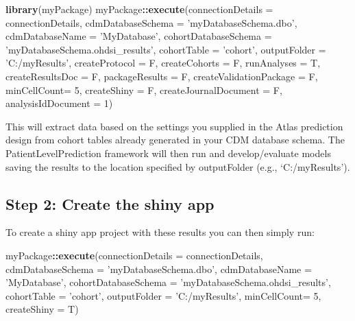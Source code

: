 \documentclass[
]{article}
\newenvironment{Shaded}{\begin{snugshade}}{\end{snugshade}}
\newcommand{\DataTypeTok}[1]{\textcolor[rgb]{0.13,0.29,0.53}{#1}}
\newcommand{\DecValTok}[1]{\textcolor[rgb]{0.00,0.00,0.81}{#1}}
\newcommand{\KeywordTok}[1]{\textcolor[rgb]{0.13,0.29,0.53}{\textbf{#1}}}
\newcommand{\NormalTok}[1]{#1}
\newcommand{\OperatorTok}[1]{\textcolor[rgb]{0.81,0.36,0.00}{\textbf{#1}}}
\newcommand{\StringTok}[1]{\textcolor[rgb]{0.31,0.60,0.02}{#1}}
\begin{document}
\begin{Shaded}
\begin{Highlighting}[]
\KeywordTok{library}\NormalTok{(myPackage)}
\NormalTok{myPackage}\OperatorTok{::}\KeywordTok{execute}\NormalTok{(}\DataTypeTok{connectionDetails =}\NormalTok{ connectionDetails,}
        \DataTypeTok{cdmDatabaseSchema =} \StringTok{'myDatabaseSchema.dbo'}\NormalTok{,}
        \DataTypeTok{cdmDatabaseName =} \StringTok{'MyDatabase'}\NormalTok{,}
        \DataTypeTok{cohortDatabaseSchema =} \StringTok{'myDatabaseSchema.ohdsi_results'}\NormalTok{,}
        \DataTypeTok{cohortTable =} \StringTok{'cohort'}\NormalTok{,}
        \DataTypeTok{outputFolder =} \StringTok{'C:/myResults'}\NormalTok{,}
        \DataTypeTok{createProtocol =}\NormalTok{ F,}
        \DataTypeTok{createCohorts =}\NormalTok{ F,}
        \DataTypeTok{runAnalyses =}\NormalTok{ T,}
        \DataTypeTok{createResultsDoc =}\NormalTok{ F,}
        \DataTypeTok{packageResults =}\NormalTok{ F,}
        \DataTypeTok{createValidationPackage =}\NormalTok{ F, }
        \DataTypeTok{minCellCount=} \DecValTok{5}\NormalTok{,}
        \DataTypeTok{createShiny =}\NormalTok{ F,}
        \DataTypeTok{createJournalDocument =}\NormalTok{ F,}
        \DataTypeTok{analysisIdDocument =} \DecValTok{1}\NormalTok{)}
\end{Highlighting}
\end{Shaded}

This will extract data based on the settings you supplied in the Atlas
prediction design from cohort tables already generated in your CDM
database schema. The PatientLevelPrediction framework will then run and
develop/evaluate models saving the results to the location specified by
outputFolder (e.g., `C:/myResults').

\hypertarget{step-2-create-the-shiny-app}{%
\subsection{Step 2: Create the shiny
app}\label{step-2-create-the-shiny-app}}

To create a shiny app project with these results you can then simply
run:

\begin{Shaded}
\begin{Highlighting}[]
\NormalTok{myPackage}\OperatorTok{::}\KeywordTok{execute}\NormalTok{(}\DataTypeTok{connectionDetails =}\NormalTok{ connectionDetails,}
        \DataTypeTok{cdmDatabaseSchema =} \StringTok{'myDatabaseSchema.dbo'}\NormalTok{,}
        \DataTypeTok{cdmDatabaseName =} \StringTok{'MyDatabase'}\NormalTok{,}
        \DataTypeTok{cohortDatabaseSchema =} \StringTok{'myDatabaseSchema.ohdsi_results'}\NormalTok{,}
        \DataTypeTok{cohortTable =} \StringTok{'cohort'}\NormalTok{,}
        \DataTypeTok{outputFolder =} \StringTok{'C:/myResults'}\NormalTok{,}
        \DataTypeTok{minCellCount=} \DecValTok{5}\NormalTok{,}
        \DataTypeTok{createShiny =}\NormalTok{ T)}
\end{Highlighting}
\end{Shaded}
\end{document}
